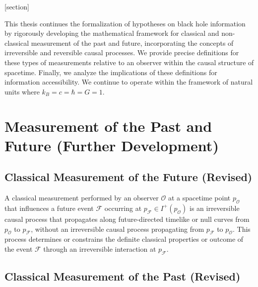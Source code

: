 





\theoremstyle{definition}
[section]
















	
	
		This thesis continues the formalization of hypotheses on black hole information by rigorously developing the mathematical framework for classical and non-classical measurement of the past and future, incorporating the concepts of irreversible and reversible causal processes. We provide precise definitions for these types of measurements relative to an observer within the causal structure of spacetime. Finally, we analyze the implications of these definitions for information accessibility. We continue to operate within the framework of natural units where $k_B = c = \hbar = G = 1$.

	
	\section{Measurement of the Past and Future (Further Development)}
	
	\subsection{Classical Measurement of the Future (Revised)}
	
	\begin{definition}
		A classical measurement performed by an observer $\mathcal{O}$ at a spacetime point $p_{\mathcal{O}}$ that influences a future event $\mathcal{F}$ occurring at $p_{\mathcal{F}} \in I^+(p_{\mathcal{O}})$ is an irreversible causal process that propagates along future-directed timelike or null curves from $p_{\mathcal{O}}$ to $p_{\mathcal{F}}$, without an irreversible causal process propagating from $p_{\mathcal{F}}$ to $p_{\mathcal{O}}$. This process determines or constrains the definite classical properties or outcome of the event $\mathcal{F}$ through an irreversible interaction at $p_{\mathcal{F}}$.
	\end{definition}
	
	\subsection{Classical Measurement of the Past (Revised)}
	
